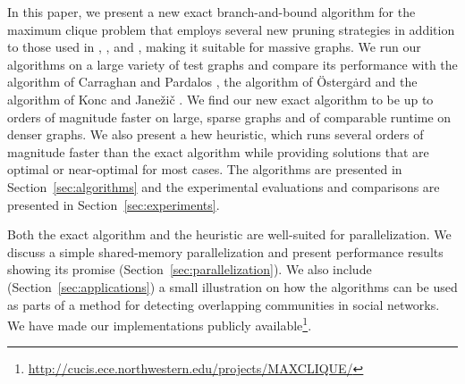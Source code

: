 In this paper, we present a new exact branch-and-bound
algorithm for the maximum clique problem that employs 
several new pruning strategies in addition to those used in \cite{pardalos},
\cite{ostergard},  \cite{citeulike:7905505} and \cite{konc2007improved},
making it suitable for massive graphs.
We run our algorithms on a large variety of test graphs and compare its performance with the
algorithm of Carraghan and Pardalos \cite{pardalos}, the algorithm of \"{O}sterg\.{a}rd \cite{ostergard} and the algorithm of Konc and Jane\v{z}i\v{c} \cite{konc2007improved}. 
We find our new exact algorithm to be up to orders of magnitude faster on large,
sparse graphs and of comparable runtime on denser graphs.
We also present a hew heuristic, which runs several orders of magnitude faster than the exact algorithm while providing solutions that are optimal or near-optimal for most cases.
The algorithms are presented in Section~\ref{sec:algorithms} and the experimental evaluations and comparisons are presented in Section~\ref{sec:experiments}. 

Both the exact algorithm and the heuristic are well-suited for parallelization.
We discuss a simple shared-memory parallelization and present performance 
results showing its promise (Section~\ref{sec:parallelization}). We also include (Section~\ref{sec:applications})
a small illustration on how the algorithms can be used as parts of a method
for detecting overlapping communities in social networks.
We have made our implementations publicly available\footnote{\url{http://cucis.ece.northwestern.edu/projects/MAXCLIQUE/}}.




